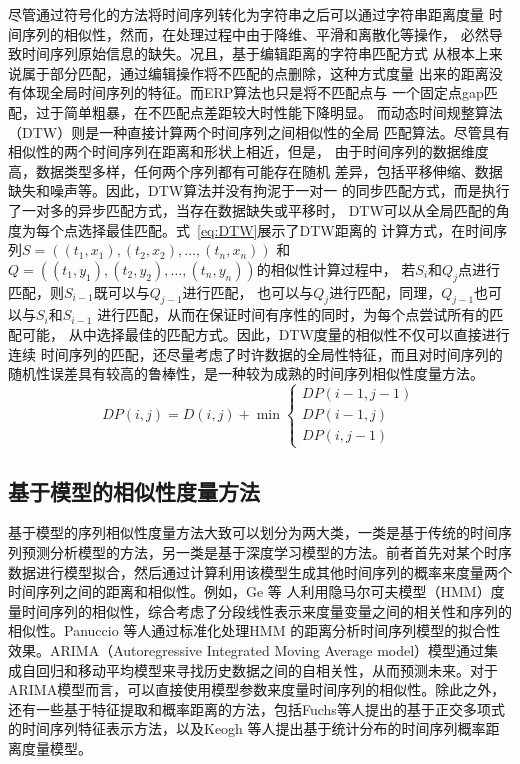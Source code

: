 尽管通过符号化的方法将时间序列转化为字符串之后可以通过字符串距离度量
时间序列的相似性，然而，在处理过程中由于降维、平滑和离散化等操作，
必然导致时间序列原始信息的缺失。况且，基于编辑距离的字符串匹配方式
从根本上来说属于部分匹配，通过编辑操作将不匹配的点删除，这种方式度量
出来的距离没有体现全局时间序列的特征。而ERP算法也只是将不匹配点与
一个固定点gap匹配，过于简单粗暴，在不匹配点差距较大时性能下降明显。
而动态时间规整算法（DTW）则是一种直接计算两个时间序列之间相似性的全局
匹配算法。尽管具有相似性的两个时间序列在距离和形状上相近，但是，
由于时间序列的数据维度高，数据类型多样，任何两个序列都有可能存在随机
差异，包括平移伸缩、数据缺失和噪声等。因此，DTW算法并没有拘泥于一对一
的同步匹配方式，而是执行了一对多的异步匹配方式，当存在数据缺失或平移时，
DTW可以从全局匹配的角度为每个点选择最佳匹配。式~\ref{eq:DTW}展示了DTW距离的
计算方式，在时间序列$S=((t_1,x_1 ),(t_2,x_2 ),\dots,(t_n,x_n ))$
和$Q=((t_1,y_1 ),(t_2,y_2 ),\dots,(t_n,y_n ))$的相似性计算过程中，
若$S_i$和$Q_j$点进行匹配，则$S_{i-1}$既可以与$Q_{j-1}$进行匹配，
也可以与$Q_j$进行匹配，同理，$Q_{j-1}$也可以与$S_i$和$S_{i-1}$
进行匹配，从而在保证时间有序性的同时，为每个点尝试所有的匹配可能，
从中选择最佳的匹配方式。因此，DTW度量的相似性不仅可以直接进行连续
时间序列的匹配，还尽量考虑了时许数据的全局性特征，而且对时间序列的
随机性误差具有较高的鲁棒性，是一种较为成熟的时间序列相似性度量方法。
\begin{equation}
  D P(i, j)=D(i, j)+\min \left\{\begin{array}{c}
    D P(i-1, j-1) \\
    D P(i-1, j) \\
    D P(i, j-1)
    \end{array}\right.
    \label{eq:DTW}
\end{equation}

\subsection{基于模型的相似性度量方法}
基于模型的序列相似性度量方法大致可以划分为两大类，一类是基于传统的时间序列预测分析模型的方法，另一类是基于深度学习模型的方法。前者首先对某个时序数据进行模型拟合，然后通过计算利用该模型生成其他时间序列的概率来度量两个时间序列之间的距离和相似性。例如，Ge 等 人利用隐马尔可夫模型（HMM）度量时间序列的相似性，综合考虑了分段线性表示来度量变量之间的相关性和序列的相似性。Panuccio 等人通过标准化处理HMM 的距离分析时间序列模型的拟合性效果。ARIMA（Autoregressive Integrated Moving Average model）模型通过集成自回归和移动平均模型来寻找历史数据之间的自相关性，从而预测未来。对于ARIMA模型而言，可以直接使用模型参数来度量时间序列的相似性。除此之外，还有一些基于特征提取和概率距离的方法，包括Fuchs等人提出的基于正交多项式的时间序列特征表示方法，以及Keogh 等人提出基于统计分布的时间序列概率距离度量模型。

